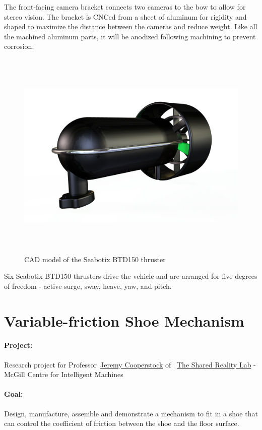 \documentclass[12pt, landscape]{article}
\begin{document}
The front-facing camera bracket connects two cameras to the bow to allow for stereo vision.  The bracket is CNCed from a sheet of aluminum for rigidity and shaped to maximize the distance between the cameras and reduce weight.  Like all the machined aluminum parts, it will be anodized following machining to prevent corrosion.

\begin{figure}[H]
\centering
\includegraphics[height=4in]{media/THRUSTER-RENDER-2-ALPHA.png}
\caption{CAD model of the Seabotix BTD150 thruster}
\label{thruster}
\end{figure}

Six Seabotix BTD150 thrusters drive the vehicle and are arranged for five degrees of freedom - active surge, sway, heave, yaw, and pitch.

\clearpage

\section{Variable-friction Shoe Mechanism}
\paragraph{Project:} Research project for Professor~\href{http://www.cim.mcgill.ca/~jer/}{Jeremy Cooperstock} of~ \href{http://www.cim.mcgill.ca/sre}{The Shared Reality Lab} - McGill Centre for Intelligent Machines
\paragraph{Goal:} Design, manufacture, assemble and demonstrate a mechanism to fit in a shoe that can control the coefficient of friction between the shoe and the floor surface.
\end{document}
